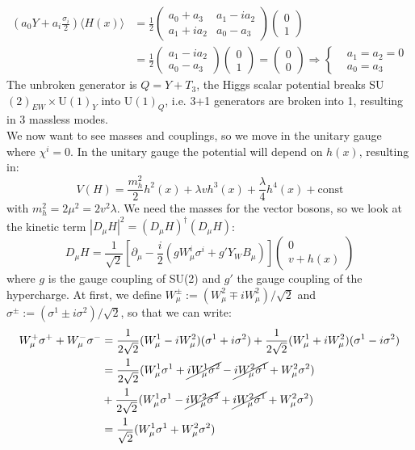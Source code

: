 \documentclass[../main.tex]{subfiles}
\begin{document}
\begin{align*}
\left(a_0Y+a_i\frac{\sigma_i}{2}\right)\langle H(x)\rangle&=\frac{1}{2}\left(\begin{array}{cc}
    a_0+a_3 & a_1-ia_2 \\
    a_1+ia_2 & a_0-a_3
\end{array}\right)\begin{pmatrix}
    0\\1
\end{pmatrix}\\
&=\frac{1}{2}\begin{pmatrix}
    a_1-ia_2\\a_0-a_3
\end{pmatrix}
\begin{pmatrix}
    0\\1
\end{pmatrix}=\begin{pmatrix}
    0\\0
\end{pmatrix}\Rightarrow\left\{\begin{aligned}
    &a_1=a_2=0\\
    &a_0=a_3
\end{aligned}\right.
\end{align*}
The unbroken generator is $Q=Y+T_3$, the Higgs scalar potential breaks SU$(2)_{EW}\times$U$(1)_Y$ into U$(1)_Q$, i.e. 3+1 generators are broken into 1, resulting in 3 massless modes.\\
We now want to see masses and couplings, so we move in the unitary gauge where $\chi^i=0$. In the unitary gauge the potential will depend on $h(x)$, resulting in:
\[
V(H)=\frac{m_h^2}{2}h^2(x)+\lambda vh^3(x)+\frac{\lambda}{4}h^4(x)+\text{const}
\]
with $m_h^2=2\mu^2=2v^2\lambda$. We need the masses for the vector bosons, so we look at the kinetic term
$|D_\mu H|^2=(D_\mu H)^\dagger(D_\mu H)$:
\[
D_\mu H=\frac{1}{\sqrt{2}}\left[\partial_\mu-\frac{i}{2}(gW_\mu^i\sigma^i+g'Y_WB_\mu)\right]\begin{pmatrix}0 \\ v+h(x)\end{pmatrix}
\]
where $g$ is the gauge coupling of SU(2) and $g'$ the gauge coupling of the hypercharge. At first, we define $W_\mu^\pm:=(W_\mu^2\mp iW_\mu^2)/\sqrt{2}$ and $\sigma^\pm:=(\sigma^1\pm i\sigma^2)/\sqrt{2}$, so that we can write:
\begin{align*}
W_\mu^+\sigma^++W_\mu^-\sigma^-&=\frac{1}{2\sqrt{2}}(W_\mu^1-iW_\mu^2)(\sigma^1+i\sigma^2)+\frac{1}{2\sqrt{2}}(W_\mu^1+iW_\mu^2)(\sigma^1-i\sigma^2)\\
&=\frac{1}{2\sqrt{2}}(W_\mu^1\sigma^1+\cancel{iW_\mu^1\sigma^2}-\cancel{iW_\mu^2\sigma^1}+W_\mu^2\sigma^2)\\
&+\frac{1}{2\sqrt{2}}(W_\mu^1\sigma^1-\cancel{iW_\mu^2\sigma^2}+\cancel{iW_\mu^2\sigma^1}+W_\mu^2\sigma^2)\\
&=\frac{1}{\sqrt{2}}(W_\mu^1\sigma^1+W_\mu^2\sigma^2)
\end{align*}
\end{document}
